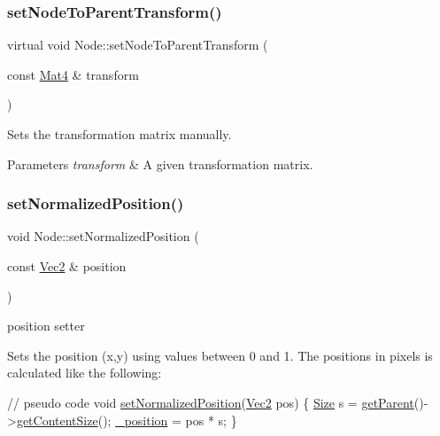 \subsubsection{\texorpdfstring{set\+Node\+To\+Parent\+Transform()}{setNodeToParentTransform()}\hspace{0.1cm}{\footnotesize\ttfamily [2/2]}}
{\footnotesize\ttfamily virtual void Node\+::set\+Node\+To\+Parent\+Transform (\begin{DoxyParamCaption}\item[{const \hyperlink{classMat4}{Mat4} \&}]{transform }\end{DoxyParamCaption})\hspace{0.3cm}{\ttfamily [virtual]}}

Sets the transformation matrix manually.


\begin{DoxyParams}{Parameters}
{\em transform} & A given transformation matrix. \\
\hline
\end{DoxyParams}
\mbox{\label{classNode_a3665662090ae9ebd3820ee4e7199da7b}} 
\subsubsection{\texorpdfstring{set\+Normalized\+Position()}{setNormalizedPosition()}}
{\footnotesize\ttfamily void Node\+::set\+Normalized\+Position (\begin{DoxyParamCaption}\item[{const \hyperlink{classVec2}{Vec2} \&}]{position }\end{DoxyParamCaption})\hspace{0.3cm}{\ttfamily [virtual]}}



position setter 

Sets the position (x,y) using values between 0 and 1. The positions in pixels is calculated like the following\+: 
\begin{DoxyCode}
\textcolor{comment}{// pseudo code}
\textcolor{keywordtype}{void} \hyperlink{classNode_a3665662090ae9ebd3820ee4e7199da7b}{setNormalizedPosition}(\hyperlink{classVec2}{Vec2} pos) \{
  \hyperlink{classSize}{Size} s = \hyperlink{classNode_af4c8a4ae726c6dd984db05c89454652d}{getParent}()->\hyperlink{classNode_a3828836a62dbf0862ecaa99a72babc13}{getContentSize}();
  \hyperlink{classNode_a3b3dff369c98537eeeab4c0bcbf3a69f}{\_position} = pos * s;
\}
\end{DoxyCode}



